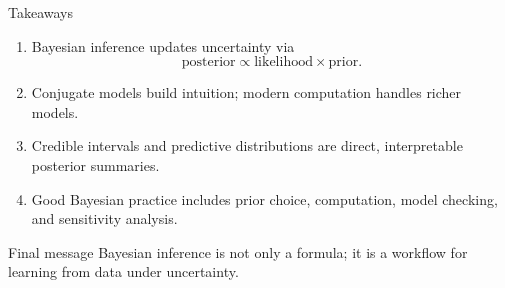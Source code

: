 \documentclass[aspectratio=169]{beamer}
\begin{document}
\begin{frame}{Takeaways}
\begin{enumerate}
  \item Bayesian inference updates uncertainty via
  \[
    \text{posterior} \propto \text{likelihood} \times \text{prior}.
  \]
  \item Conjugate models build intuition; modern computation handles richer models.
  \item Credible intervals and predictive distributions are direct, interpretable posterior summaries.
  \item Good Bayesian practice includes prior choice, computation, model checking, and sensitivity analysis.
\end{enumerate}

\vspace{0.5em}
\begin{block}{Final message}
Bayesian inference is not only a formula; it is a workflow for learning from data under uncertainty.
\end{block}
\end{frame}
\end{document}
